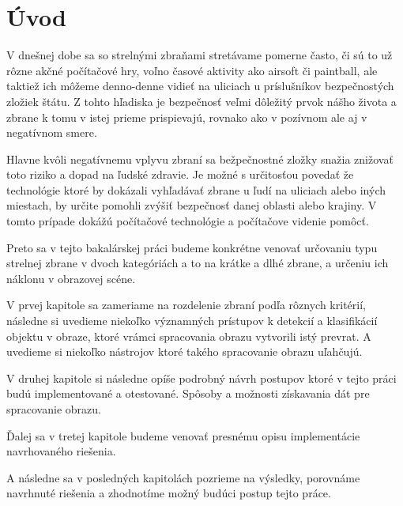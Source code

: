 \chapter{Úvod}
V dnešnej dobe sa so strelnými zbraňami stretávame pomerne často, či sú to už rôzne akčné počítačové hry,
    voľno časové aktivity ako airsoft či paintball, ale taktiež ich môžeme denno-denne vidieť na uliciach u príslušníkov bezpečnostých zložiek štátu.
Z tohto hľadiska je bezpečnosť veľmi dôležitý prvok nášho života a zbrane k tomu v istej prieme prispievajú,
    rovnako ako v pozívnom ale aj v negatívnom smere.

Hlavne kvôli negatívnemu vplyvu zbraní sa bežpečnostné zložky snažia znižovať toto riziko a dopad na ľudské zdravie.
Je možné s určitosťou povedať že technológie ktoré by dokázali vyhľadávať zbrane u ľudí na uliciach alebo iných miestach,
    by určite pomohli zvýšiť bezpečnosť danej oblasti alebo krajiny.
V tomto prípade dokážú počítačové technológie a počítačove videnie pomôcť.

Preto sa v tejto bakalárskej práci budeme konkrétne venovať určovaniu typu strelnej zbrane v dvoch kategóriách a to na
    krátke a dlhé zbrane, a určeniu ich náklonu v obrazovej scéne.

V prvej kapitole sa zameriame na rozdelenie zbraní podľa rôznych kritérií, následne si uvedieme niekoľko
    významných prístupov k detekcií a klasifikácií objektu v obraze, ktoré vrámci spracovania obrazu vytvorili istý prevrat.
A uvedieme si niekoľko nástrojov ktoré takého spracovanie obrazu uľahčujú.

V druhej kapitole si následne opíše podrobný návrh postupov ktoré v tejto práci budú implementované a otestované.
Spôsoby a možnosti získavania dát pre spracovanie obrazu.

Ďalej sa v tretej kapitole budeme venovať presnému opisu implementácie navrhovaného riešenia.

A následne sa v posledných kapitolách pozrieme na výsledky, porovnáme navrhnuté riešenia a zhodnotíme možný budúci postup tejto práce.

